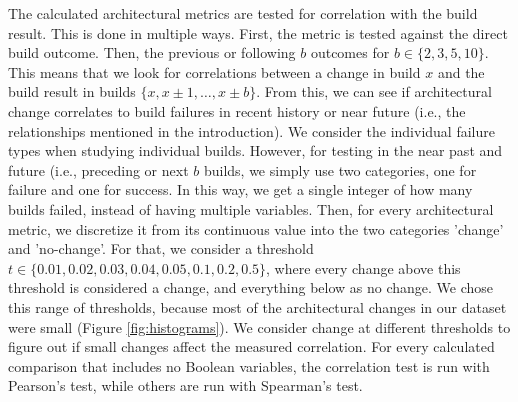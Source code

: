 \documentclass[sigconf, anonymous, review]{acmart}
\begin{document}
The calculated architectural metrics are tested for correlation with the build result. This is done in multiple ways. First, the metric is tested against the direct build outcome. Then, the previous or following $b$ outcomes for $b \in \{2, 3, 5, 10\}$. This means that we look for correlations between a change in build $x$ and the build result in builds $\{x, x \pm 1, \hdots, x \pm b\}$. From this, we can see if architectural change correlates to build failures in recent history or near future (i.e., the relationships mentioned in the introduction). 
We consider the individual failure types when studying individual builds. 
However, for testing in the near past and future (i.e., preceding or next $b$ builds, we simply use two categories, one for failure and one for success. In this way, we get a single integer of how many builds failed, instead of having multiple variables. 
Then, for every architectural metric, we discretize it from its continuous value into the two categories 'change' and 'no-change'. For that, we consider a threshold $t \in \{0.01, 0.02, 0.03, 0.04, 0.05, 0.1, 0.2, 0.5\}$, where every change above this threshold is considered a change, and everything below as no change. 
We chose this range of thresholds, because most of the architectural changes in our dataset were small (Figure \ref{fig:histograms}). 
We consider change at different thresholds to figure out if small changes affect the measured correlation. 
For every calculated comparison that includes no Boolean variables, the correlation test is run with Pearson's test, while others are run with Spearman's test. 
\end{document}
